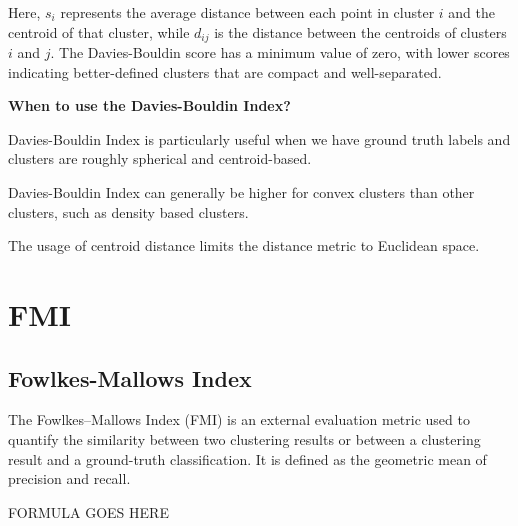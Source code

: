 
Here, \( s_i \) represents the average distance between each point in cluster \( i \) and the centroid of that cluster,
while \( d_{ij} \) is the distance between the centroids of clusters \( i \) and \( j \). The Davies-Bouldin score has a
minimum value of zero, with lower scores indicating better-defined clusters that are compact and well-separated.

\textbf{When to use the Davies-Bouldin Index?}

Davies-Bouldin Index is particularly useful when we have ground truth labels and clusters are roughly spherical and centroid-based.

{
\item Davies-Bouldin Index can generally be higher for convex clusters than other clusters, such as density based clusters.
\item The usage of centroid distance limits the distance metric to Euclidean space.
}

\clearpage
\thispagestyle{clusteringstyle}
\section{FMI}
\subsection{Fowlkes-Mallows Index}

The Fowlkes–Mallows Index (FMI) is an external evaluation metric used to quantify the similarity between two clustering results
or between a clustering result and a ground-truth classification. It is defined as the geometric mean of precision and recall.

\begin{center}
    FORMULA GOES HERE

\end{center}


